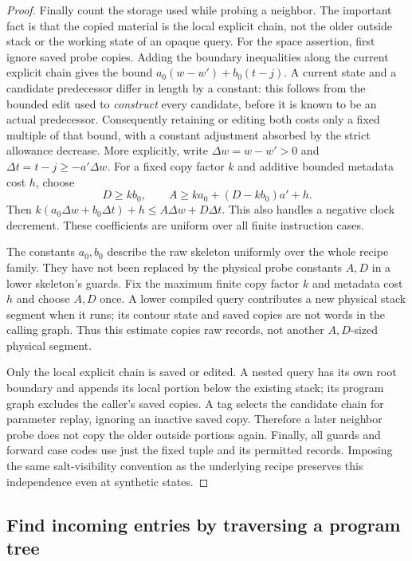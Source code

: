 \begin{proof}
Finally count the storage used while probing a neighbor. The important fact is that the copied material is the local explicit chain, not the older outside stack or the working state of an opaque query. For the space assertion, first ignore saved probe copies.  Adding the
boundary inequalities along the current explicit chain gives the bound
$a_0(w-w')+b_0(t-j)$.  A current state and a candidate predecessor differ in
length by a constant: this follows from the bounded edit used to
\emph{construct} every candidate, before it is known to be an actual
predecessor.  Consequently retaining or editing both costs only a fixed
multiple of that bound, with a constant adjustment absorbed by the
strict allowance decrease.  More explicitly, write
$\Delta w=w-w'>0$ and $\Delta t=t-j\ge-a'\Delta w$.  For a fixed copy
factor $k$ and additive bounded metadata cost $h$, choose
\begin{equation}\label{eq:ctrl-copy-coefficients}
 D\ge kb_0,\qquad A\ge ka_0+(D-kb_0)a'+h.
\end{equation}
Then $k(a_0\Delta w+b_0\Delta t)+h\le A\Delta w+D\Delta t$.
This also handles a negative clock decrement.  These coefficients are
uniform over all finite instruction cases.

The constants $a_0,b_0$ describe the raw skeleton uniformly over the
whole recipe family.  They have not been replaced by the physical probe
constants $A,D$ in a lower skeleton's guards.  Fix the maximum finite
copy factor $k$ and metadata cost $h$ and choose $A,D$ once.  A lower
compiled query contributes a new physical stack segment when it runs;
its contour state and saved copies are not words in the calling graph.
Thus this estimate copies raw records, not another $A,D$-sized physical
segment.

Only the local explicit chain is saved or edited.  A nested query has
its own root boundary and appends its local portion below the existing
stack; its program graph excludes the caller's saved copies.  A tag
selects the candidate chain for parameter replay, ignoring an inactive
saved copy.  Therefore a later neighbor probe does not copy the older
outside portions again.  Finally, all guards and forward case codes
use just the fixed tuple and its permitted records.  Imposing the same
salt-visibility convention as the underlying recipe preserves this
independence even at synthetic states.
\end{proof}

\subsection{Find incoming entries by traversing a program tree}\label{sec:ctrl-incoming}

